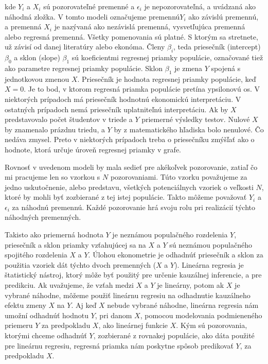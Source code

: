 \documentclass[]{tukediphc}
\begin{document}
kde $Y_i$ a $X_i$ sú pozorovateľné premenné a $\epsilon_i$ je nepozorovateľná, a uvádzaná ako náhodná zložka. V tomto modeli označujeme premennú$Y_i$ ako závislú premennú, a premenná $X_i$ je nazývaná ako nezávislá premenná, vysvetľujúca premenná alebo regresná premenná. Všetky pomenovania sú platné. S ktorým sa stretnete, už závisí od danej literatúry alebo ekonóma. Členy $\beta_i$, teda priesečník (intercept) $\beta_0$ a sklon (slope) $\beta_1$ sú koeficientmi regresnej priamky populácie, označované tiež ako parametre regresnej priamky populácie. Sklon $\beta_1$ je zmena $Y$ spojená s jednotkovou zmenou $X$. Priesečník je hodnota regresnej priamky populácie, keď $X = 0$. Je to bod, v ktorom regresná priamka populácie pretína ypsilonovú os. V niektorých prípadoch má priesečník hodnotnú ekonomickú interpretáciu. V ostatných prípadoch nemá priesečník uplatniteľnú interpretáciu. Ak by $X$ predstavovalo počet študentov v triede a $Y$ priemerné výsledky testov. Nulové $X$ by znamenalo prázdnu triedu, a $Y$ by z matematického hľadiska bolo nenulové. Čo nedáva zmysel. Preto v niektorých prípadoch treba o priesečníku zmýšľať ako o hodnote, ktorá určuje úroveň regresnej priamky v grafe. 

Rovnosť v uvedenom modeli by mala sedieť pre akékoľvek pozorovanie, zatiaľ čo mi pracujeme len so vzorkou s $N$ pozorovaniami. Túto vzorku považujeme za jedno uskutočnenie, alebo predstavu, všetkých potenciálnych vzoriek o veľkosti $N$, ktoré by mohli byť zozbierané z tej istej populácie. Takto môžeme považovať $Y_i$ a $\epsilon_i$ za náhodnú premennú. Každé pozorovanie hrá svoju rolu pri realizácií týchto náhodných premenných.

Takisto ako priemerná hodnota $Y$ je neznámou populačného rozdelenia $Y$, priesečník a sklon priamky vzťahujúcej sa na $X$ a $Y$ sú neznámou populačného spojitého rozdelenia $X$ a $Y$. Úlohou ekonometrie je odhadnúť priesečník a sklon za použitia vzoriek dát týchto dvoch premenných ($X$ a $Y$). Lineárna regresia je štatistický nástroj, ktorý môže byť použitý pre určenie kauzálnej inferencie, a pre predikciu. Ak uvažujeme, že vzťah medzi $X$ a $Y$ je lineárny, potom ak $X$ je vybrané náhodne, môžeme použiť lineárnu regresiu na odhadnutie kauzálneho efektu zmeny $X$ na $Y$. Aj keď $X$ nebude vybrané náhodne, lineárna regresia nám umožní odhadnúť hodnotu $Y$, pri danom $X$, pomocou modelovania podmieneného priemeru $Y$ za predpokladu $X$, ako lineárnej funkcie $X$. Kým sú pozorovania, ktorými chceme odhadnúť $Y$, zozbierané z rovnakej populácie, ako dáta použité pre lineárnu regresiu, regresná priamka nám poskytne spôsob predikovať $Y$, za predpokladu $X$. 
\end{document}
